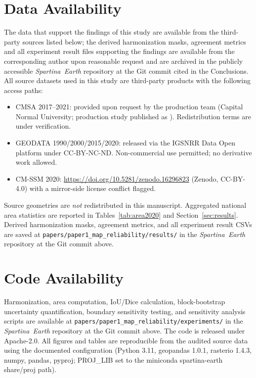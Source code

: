 \documentclass[11pt]{article}
\begin{document}
\section*{Data Availability}
\label{sec:data-availability}

The data that support the findings of this study are available from the
third-party sources listed below; the derived harmonization masks, agreement
metrics and all experiment result files supporting the findings are
available from the corresponding author upon reasonable request and are
archived in the
publicly accessible \textit{Spartina~Earth} repository at the Git commit cited
in the Conclusions. All source datasets used in this study are third-party
products with the following access paths:
\begin{itemize}[nosep]
\item CMSA 2017--2021: provided upon request by the production team
  (Capital Normal University; production study published as
  \citealp{li_2024_cmsa}). Redistribution terms are under verification.
\item GEODATA 1990/2000/2015/2020: released via the IGSNRR Data Open platform
  under CC-BY-NC-ND. Non-commercial use permitted; no derivative work allowed.
\item CM-SSM 2020: \url{https://doi.org/10.5281/zenodo.16296823} (Zenodo,
  CC-BY-4.0) with a mirror-side license conflict flagged.
\end{itemize}
Source geometries are \emph{not} redistributed in this manuscript. Aggregated
national area statistics are reported in Tables~\ref{tab:area2020} and
Section~\ref{sec:results}. Derived harmonization masks, agreement metrics, and
all experiment result CSVs are saved at
\texttt{papers/paper1\_map\_reliability/results/} in the \textit{Spartina~Earth}
repository at the Git commit above.

\section*{Code Availability}

Harmonization, area computation, IoU/Dice calculation, block-bootstrap
uncertainty quantification, boundary sensitivity testing, and sensitivity
analysis scripts are available at
\texttt{papers/paper1\_map\_reliability/experiments/} in the \textit{Spartina~Earth}
repository at the Git commit above. The code is released under Apache-2.0.
All figures and tables are reproducible from the audited source data using
the documented configuration (Python 3.11, geopandas 1.0.1, rasterio 1.4.3,
numpy, pandas, pyproj; PROJ\_LIB set to the miniconda spartina-earth share/proj
path).
\end{document}
